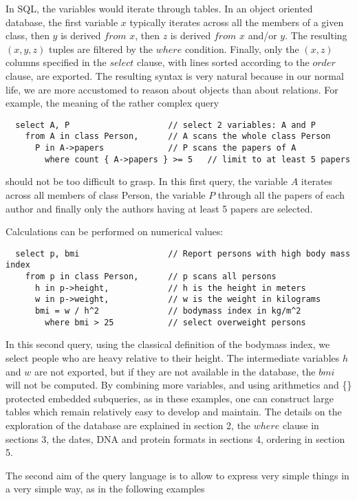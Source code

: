 \documentclass[11pt]{article}
\newcommand{\BL}{\begin{lstlisting}}
\begin{document}
In SQL, the variables would iterate through tables. In an object oriented database, the first variable $x$ 
typically iterates across all the members of a given class, then $y$ is derived $from$ $x$, then $z$ is
derived $from$ $x$ and/or $y$. The resulting $(x, y, z)$ tuples are filtered by the $where$ condition. 
Finally, only the $(x,z)$ columns specified in the $select$ clause, with lines sorted according to the $order$
clause, are exported. The resulting syntax is very natural because in our normal life, we are more accustomed
to reason about objects than about relations. For example, the meaning of the rather complex query
\BL
  select A, P                    // select 2 variables: A and P
    from A in class Person,      // A scans the whole class Person
      P in A->papers             // P scans the papers of A           
        where count { A->papers } >= 5   // limit to at least 5 papers
\end{lstlisting}
should not be too difficult to grasp. In this first query, the variable $A$ iterates across all members of class Person,
the variable $P$ through all the papers of each author and finally only the authors having at least 5 papers
are selected. 

Calculations can be performed on numerical values:
\BL
  select p, bmi                  // Report persons with high body mass index
    from p in class Person,      // p scans all persons
      h in p->height,            // h is the height in meters
      w in p->weight,            // w is the weight in kilograms   
      bmi = w / h^2              // bodymass index in kg/m^2
        where bmi > 25           // select overweight persons
\end{lstlisting}
In this second query, using the classical definition of the
bodymass index, we select people who are heavy relative to their height. 
The intermediate variables $h$ and $w$ are not exported, but if they are not available
in the database, the $bmi$ will not be computed.
By combining more variables, and using arithmetics and \{\} protected embedded subqueries,
as in these examples, one can construct large tables which remain relatively easy to develop and maintain.
The details on the exploration of the database are explained in section 2, the $where$ clause in sections 3,
the dates, DNA and protein formats in sections 4, ordering in section 5.

The second aim of the query language is to allow to express very simple things in a very simple way,
as in the following examples
\end{document}
